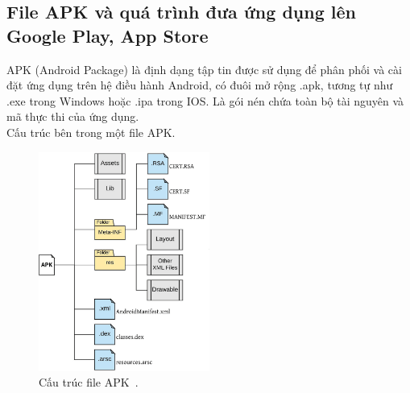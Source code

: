     \subsection{File APK và quá trình đưa ứng dụng lên Google Play, App Store}
    \renewcommand{\labelitemi}{--}
        APK (Android Package) là định dạng tập tin được sử dụng để phân phối và cài đặt ứng dụng trên hệ điều hành Android, có đuôi mở rộng .apk, tương tự như .exe trong Windows hoặc .ipa trong IOS. Là gói nén chứa toàn bộ tài nguyên và mã thực thi của ứng dụng.\\
        Cấu trúc bên trong một file APK.
        \begin{figure}[H] 
            \centering
            \includegraphics[width=0.5\textwidth]{images/apk.png}
            \caption{Cấu trúc file APK~\cite{apk-file}.}
            \label{fig:android4}
        \end{figure}
        
